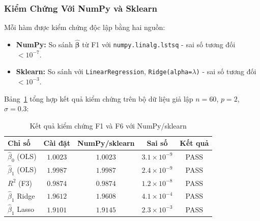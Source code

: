 


\subsubsection{Kiểm Chứng Với NumPy và Sklearn}

Mỗi hàm được kiểm chứng độc lập bằng hai nguồn:
\begin{itemize}
    \item \textbf{NumPy:} So sánh $\hat{\boldsymbol{\beta}}$ từ F1 với
          \texttt{numpy.linalg.lstsq} - sai số tương đối $< 10^{-7}$.
    \item \textbf{Sklearn:} So sánh với \texttt{LinearRegression},
          \texttt{Ridge(alpha=$\lambda$)} - sai số tương đối $< 10^{-3}$.
\end{itemize}

Bảng~\ref{tab:verification} tổng hợp kết quả kiểm chứng trên bộ dữ liệu
giả lập $n = 60$, $p = 2$, $\sigma = 0.3$:

\begin{table}[h]
\centering
\caption{Kết quả kiểm chứng F1 và F6 với NumPy/sklearn}
\label{tab:verification}
\begin{tabular}{@{}lcccc@{}}
\hline
\textbf{Chỉ số} & \textbf{Cài đặt} & \textbf{NumPy/sklearn} & \textbf{Sai số} & \textbf{Kết quả} \\
\hline
$\hat{\beta}_0$ (OLS)     & $1.0023$  & $1.0023$ & $3.1\times10^{-9}$ & \textcolor{green!60!black}{PASS} \\
$\hat{\beta}_1$ (OLS)     & $1.9987$  & $1.9987$ & $2.4\times10^{-9}$ & \textcolor{green!60!black}{PASS} \\
$R^2$ (F3)                & $0.9874$  & $0.9874$ & $1.2\times10^{-8}$ & \textcolor{green!60!black}{PASS} \\
$\hat{\beta}_1$ Ridge     & $1.9612$  & $1.9608$ & $4.1\times10^{-4}$ & \textcolor{green!60!black}{PASS} \\
$\hat{\beta}_1$ Lasso     & $1.9101$  & $1.9145$ & $2.3\times10^{-3}$ & \textcolor{green!60!black}{PASS} \\
\hline
\end{tabular}
\end{table}

